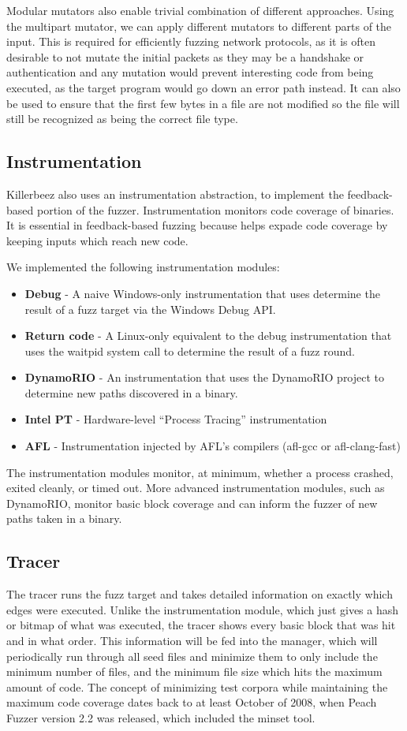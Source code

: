 Modular mutators also enable trivial combination of different approaches. Using
the multipart mutator, we can apply different mutators to different parts of
the input. This is required for efficiently fuzzing network protocols, as it is
often desirable to not mutate the initial packets as they may be a handshake or
authentication and any mutation would prevent interesting code from being
executed, as the target program would go down an error path instead. It can
also be used to ensure that the first few bytes in a file are not modified so
the file will still be recognized as being the correct file type.

\subsection{Instrumentation}
Killerbeez also uses an instrumentation abstraction, to implement the
feedback-based portion of the fuzzer. Instrumentation monitors code coverage of
binaries. It is essential in feedback-based fuzzing because helps expade code
coverage by keeping inputs which reach new code.

We implemented the following instrumentation modules:
\begin{itemize}[noitemsep]
\item \textbf{Debug} - A naive Windows-only instrumentation that uses determine the
	result of a fuzz target via the Windows Debug API.
\item \textbf{Return code} - A Linux-only equivalent to the debug instrumentation that
	uses the waitpid system call to determine the result of a fuzz round.
\item \textbf{DynamoRIO} - An instrumentation that uses the DynamoRIO project to
	determine new paths discovered in a binary.
\item \textbf{Intel PT} - Hardware-level ``Process Tracing'' instrumentation
\item \textbf{AFL} - Instrumentation injected by AFL's compilers (afl-gcc or
	afl-clang-fast)
\end{itemize}

The instrumentation modules monitor, at minimum, whether a process crashed,
exited cleanly, or timed out. More advanced instrumentation modules, such as
DynamoRIO, monitor basic block coverage and can inform the fuzzer of new paths
taken in a binary.

\subsection{Tracer}
The tracer runs the fuzz target and takes detailed information on exactly which
edges were executed.  Unlike the instrumentation module, which just gives a
hash or bitmap of what was executed, the tracer shows every basic block that
was hit and in what order.  This information will be fed into the manager,
which will periodically run through all seed files and minimize them to only
include the minimum number of files, and the minimum file size which hits the
maximum amount of code. The concept of minimizing test corpora while
maintaining the maximum code coverage dates back to at least October of
2008,\cite{peach22} when Peach Fuzzer version 2.2 was released, which included
the minset tool.

